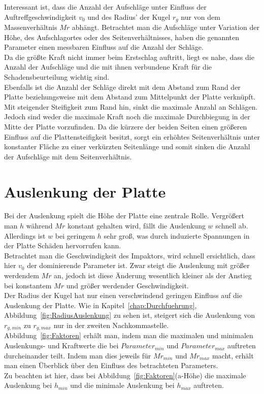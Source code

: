 Interessant ist, dass die Anzahl der Aufschläge unter Einfluss der Auftreffgeschwindigkeit $v_{0}$ und des Radius' der Kugel $r_{g}$ nur von dem Massenverhältnis $Mr$ abhängt. Betrachtet man die Aufschläge unter Variation der Höhe, des Aufschlagortes oder des Seitenverhältnisses, haben die genannten Parameter einen messbaren Einfluss auf die Anzahl der Schläge. \\
Da die größte Kraft nicht immer beim Erstschlag auftritt, liegt es nahe, dass die Anzahl der Aufschläge und die mit ihnen verbundene Kraft für die Schadensbeurteilung wichtig sind.\\
Ebenfalls ist die Anzahl der Schläge direkt mit dem Abstand zum Rand der Platte beziehungsweise mit dem Abstand zum Mittelpunkt der Platte verknüpft. Mit steigender Steifigkeit zum Rand hin, sinkt die maximale Anzahl an Schlägen. Jedoch sind weder die maximale Kraft noch die maximale Durchbiegung in der Mitte der Platte vorzufinden. Da die kürzere der beiden Seiten einen größeren Einfluss auf die Plattensteifigkeit besitzt, sorgt ein erhöhtes Seitenverhältnis unter konstanter Fläche zu einer verkürzten Seitenlänge und somit sinken die Anzahl der Aufschläge mit dem Seitenverhältnis.

\section{Auslenkung der Platte}
\label{sec:Auslenkung}

Bei der Auslenkung spielt die Höhe der Platte eine zentrale Rolle. Vergrößert man $h$ während $Mr$ konstant gehalten wird, fällt die Auslenkung $w$ schnell ab. Allerdings ist $w$ bei geringem $h$ sehr groß, was durch induzierte Spannungen in der Platte Schäden hervorrufen kann.\\
Betrachtet man die Geschwindigkeit des Impaktors, wird schnell ersichtlich, dass hier $v_{0}$ der dominierende Parameter ist. Zwar steigt die Auslenkung mit größer werdendem $Mr$ an, jedoch ist diese Änderung wesentlich kleiner als der Anstieg bei konstantem $Mr$ und größer werdender Geschwindigkeit.\\
Der Radius der Kugel hat nur einen verschwindend geringen Einfluss auf die Auslenkung der Platte. Wie in Kapitel~\ref{chap:Durchfuehrung}, Abbildung~\ref{fig:RadiusAuslenkung} zu sehen ist, steigert sich die Auslenkung von $r_{g,min}$ zu $r_{g,max}$ nur in der zweiten Nachkommastelle. \\
Abbildung~\ref{fig:Faktoren} erhält man, indem man die maximalen und minimalen Auslenkungs- und Kraftwerte die bei $Parameter_{min}$ und $Parameter_{max}$ auftreten durcheinander teilt. Indem man dies jeweils für $Mr_{min}$ und $Mr_{max}$ macht, erhält man einen Überblick über den Einfluss des betrachteten Parameters.\\
Zu beachten ist hier, dass bei Abbildung~\ref{fig:Faktoren}(a-Höhe) die maximale Auslenkung bei $h_{min}$ und die minimale Auslenkung bei $h_{max}$ auftreten.

